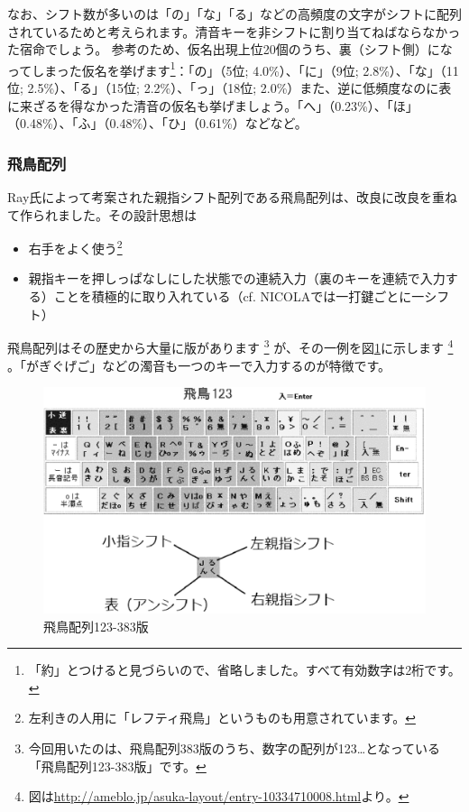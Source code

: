 なお、シフト数が多いのは「の」「な」「る」などの高頻度の文字がシフトに配列されているためと考えられます。清音キーを非シフトに割り当てねばならなかった宿命でしょう。
参考のため、仮名出現上位20個のうち、裏（シフト側）になってしまった仮名を挙げます\footnote{「約」とつけると見づらいので、省略しました。すべて有効数字は2桁です。}：「の」（5位; 4.0\%）、「に」（9位; 2.8\%）、「な」（11位; 2.5\%）、「る」（15位; 2.2\%）、「っ」（18位; 2.0\%）また、逆に低頻度なのに表に来ざるを得なかった清音の仮名も挙げましょう。「へ」（0.23\%）、「ほ」（0.48\%）、「ふ」（0.48\%）、「ひ」（0.61\%）などなど。

\subsubsection*{飛鳥配列}

Ray氏によって考案された親指シフト配列である飛鳥配列は、改良に改良を重ねて作られました。その設計思想は
\begin{itemize}
\item 右手をよく使う\footnote{左利きの人用に「レフティ飛鳥」というものも用意されています。}
\item 親指キーを押しっぱなしにした状態での連続入力（裏のキーを連続で入力する）ことを積極的に取り入れている（cf. NICOLAでは一打鍵ごとに一シフト）
\end{itemize}

飛鳥配列はその歴史から大量に版があります%
\footnote{今回用いたのは、飛鳥配列383版のうち、数字の配列が123\ldots となっている「飛鳥配列123-383版」です。}
が、その一例を図\ref{fig:asuka}に示します%
\footnote{図は\url{http://ameblo.jp/asuka-layout/entry-10334710008.html}より。}%
。「がぎぐげご」などの濁音も一つのキーで入力するのが特徴です。

\begin{figure}[htbp]
 \begin{center}
  \includegraphics[width=0.8\hsize]{asuka.eps}
 \end{center}
 \caption{飛鳥配列123-383版}
 
 \label{fig:asuka}
\end{figure}

